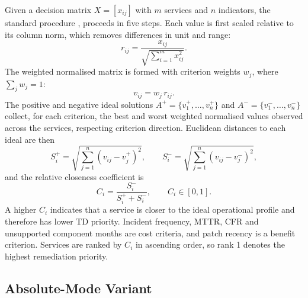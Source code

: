 \documentclass[
  journal,
]{IEEEtran}%
\begin{document}
Given a decision matrix \(X = [x_{ij}]\) with \(m\) services and \(n\)
indicators, the standard procedure
,
 proceeds in five
steps. Each value is first scaled relative to its column norm, which
removes differences in unit and range: \begin{equation}\label{eq:norm}
r_{ij} = \frac{x_{ij}}{\sqrt{\sum_{i=1}^{m} x_{ij}^2}}.
\end{equation} The weighted normalised matrix is formed with criterion
weights \(w_j\), where \(\sum_j w_j = 1\):
\begin{equation}\label{eq:weighted}
v_{ij} = w_j \, r_{ij}.
\end{equation} The positive and negative ideal solutions
\(A^{+} = \{v_1^{+}, \ldots, v_n^{+}\}\) and
\(A^{-} = \{v_1^{-}, \ldots, v_n^{-}\}\) collect, for each criterion,
the best and worst weighted normalised values observed across the
services, respecting criterion direction. Euclidean distances to each
ideal are then \begin{equation}\label{eq:dist}
S_i^{+} = \sqrt{\sum_{j=1}^{n}(v_{ij} - v_j^{+})^2}, \qquad
S_i^{-} = \sqrt{\sum_{j=1}^{n}(v_{ij} - v_j^{-})^2},
\end{equation} and the relative closeness coefficient is
\begin{equation}\label{eq:closeness}
C_i = \frac{S_i^{-}}{S_i^{+} + S_i^{-}}, \qquad C_i \in [0, 1].
\end{equation} A higher \(C_i\) indicates that a service is closer to
the ideal operational profile and therefore has lower TD priority.
Incident frequency, MTTR, CFR and unsupported component months are cost
criteria, and patch recency is a benefit criterion. Services are ranked
by \(C_i\) in ascending order, so rank 1 denotes the highest remediation
priority.

\subsection{Absolute-Mode Variant}\label{absolute-mode-variant}
\end{document}
